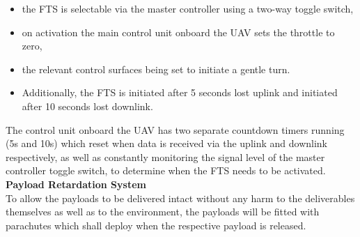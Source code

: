 \begin{itemize}
\item the FTS is selectable via the master controller using a two-way toggle switch,
\item on activation the main control unit onboard the UAV sets the throttle to zero,
\item the relevant control surfaces being set to initiate a gentle turn.
\item Additionally, the FTS is initiated after 5 seconds lost uplink and initiated after 10 seconds lost downlink.
\end{itemize}

\noindent The control unit onboard the UAV has two separate countdown timers running (5s and 10s) which reset when data is received via the uplink and downlink respectively, as well as constantly monitoring the signal level of the master controller toggle switch, to determine when the FTS needs to be activated. \\

\noindent \textbf{Payload Retardation System} \\
To allow the payloads to be delivered intact without any harm to the deliverables themselves as well as to the environment, the payloads will be fitted with parachutes which shall deploy when the respective payload is released.